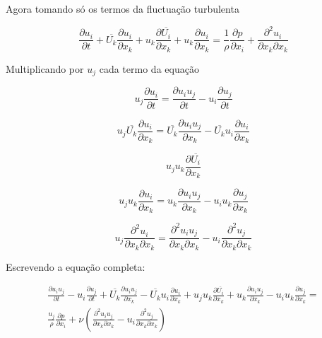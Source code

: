 \documentclass[12pt]{article}
\begin{document}
Agora tomando só os termos da fluctuação turbulenta

\begin{equation}
	 \frac{\partial u_i}{\partial t} +  \overline{U_k} \frac{\partial u_i}{\partial x_k} + u_k \frac{\partial \overline{U_i}}{\partial x_k} + u_k \frac{\partial u_i}{\partial x_k} = \frac{1}{\rho} \frac{\partial p}{\partial x_i} +  \frac{\partial ^ 2 u_i}{\partial x_k \partial x_k}
\end{equation}

Multiplicando por $u_j$ cada termo da equação

\begin{equation}
	u_j\frac{\partial u_i}{\partial t} = \frac{\partial u_i u_j}{\partial t} - u_i \frac{\partial u_j}{\partial t}
\end{equation}

\begin{equation}
	u_j\overline{U_k} \frac{\partial u_i}{\partial x_k} = \overline{U_k} \frac{\partial u_i u_j}{\partial x_k} - \overline{U_k} u_i \frac{\partial u_i}{\partial x_k}
\end{equation}

\begin{equation}
	u_ju_k \frac{\partial \overline{U_i}}{\partial x_k} 
\end{equation}

\begin{equation}
	u_ju_k \frac{\partial u_i}{\partial x_k} = u_k \frac{\partial u_i u_j}{\partial x_k} - u_iu_k \frac{\partial u_j}{\partial x_k}
\end{equation}

\begin{equation}
	u_j\frac{\partial ^ 2 u_i}{\partial x_k \partial x_k} = \frac{\partial ^ 2 u_i u_j}{\partial x_k \partial x_k} - u_i\frac{\partial ^ 2 u_j}{\partial x_k \partial x_k}
\end{equation}

Escrevendo a equação completa:

\begin{equation}
	\begin{split}
		\frac{\partial u_i u_j}{\partial t} 
		- u_i \frac{\partial u_j}{\partial t} 
		+ \overline{U_k} \frac{\partial u_i u_j}{\partial x_k} 
		- \overline{U_k} u_i \frac{\partial u_i}{\partial x_k} 
		+ u_j u_k \frac{\partial \overline{U_i}}{\partial x_k} 
		+ u_k \frac{\partial u_i u_j}{\partial x_k} 
		- u_i u_k \frac{\partial u_j}{\partial x_k} 
		= \\
		\frac{u_j}{\rho} \frac{\partial p}{\partial x_i} +   \nu\left(  \frac{\partial ^ 2 u_i u_j}{\partial x_k \partial x_k} - u_i\frac{\partial ^ 2 u_j}{\partial x_k \partial x_k}\right) 
	\end{split}
\end{equation}
\end{document}
